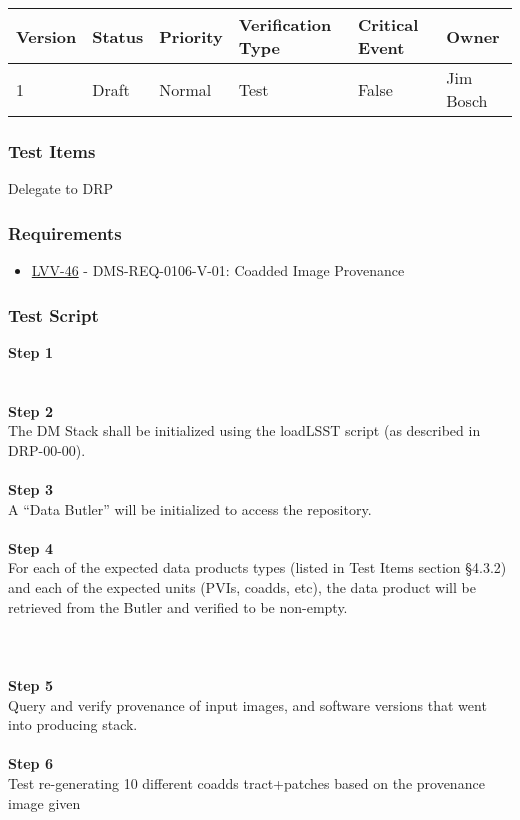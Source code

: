\begin{longtable}[]{@{}llllll@{}}
\toprule
Version & Status & Priority & Verification Type & Critical Event &
Owner\tabularnewline
\midrule
\endhead
1 & Draft & Normal & Test & False & Jim Bosch\tabularnewline
\bottomrule
\end{longtable}

\hypertarget{test-items-40}{%
\subsubsection{Test Items}\label{test-items-40}}

Delegate to DRP

\hypertarget{requirements-41}{%
\subsubsection{Requirements}\label{requirements-41}}

\begin{itemize}
\tightlist
\item
  \href{https://jira.lsstcorp.org/browse/LVV-46}{LVV-46} -
  DMS-REQ-0106-V-01: Coadded Image Provenance
\end{itemize}

\hypertarget{test-script-41}{%
\subsubsection{Test Script}\label{test-script-41}}

\textbf{Step 1}\\
~\\
~\\
\textbf{Step 2}\\
The DM Stack shall be initialized using the loadLSST script (as
described in DRP-00-00).\\
~\\
\textbf{Step 3}\\
A ``Data Butler'' will be initialized to access the repository.\\
~\\
\textbf{Step 4}\\
For each of the expected data products types (listed in Test Items
section §4.3.2) and each of the expected units (PVIs, coadds, etc), the
data product will be retrieved from the Butler and verified to be
non-empty.\\
~\\
~\\
~\\
\textbf{Step 5}\\
Query and verify provenance of input images, and software versions that
went into producing stack.\\
~\\
\textbf{Step 6}\\
Test re-generating 10 different coadds tract+patches based on the
provenance image given\\
~\\

